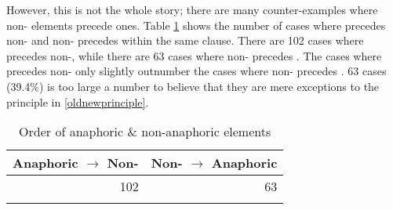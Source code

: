
However,
this is not the whole story;
there are many counter-examples where non- elements precede  ones. %
 Table \ref{GNT} shows the number of cases
where  precedes non- and non- precedes  within the same clause.
There are 102 cases where  precedes non-,
while there are 63 cases where non- precedes .
The cases where  precedes non- only slightly outnumber the cases where non- precedes .
63 cases (39.4\%) is too large a number to believe that they are mere exceptions to the principle in \ref{oldnewprinciple}.

\begin{table}
\centering
	\caption{Order of anaphoric \& non-anaphoric elements}
\begin{tabular}{rr}
	\lsptoprule
	Anaphoric $\to$ Non-\isi{anaphoric} & Non-\isi{anaphoric} $\to$ Anaphoric \\
	\hline
	102 & 63 \\
	\lspbottomrule
\end{tabular}
	\label{GNT}
\end{table}

